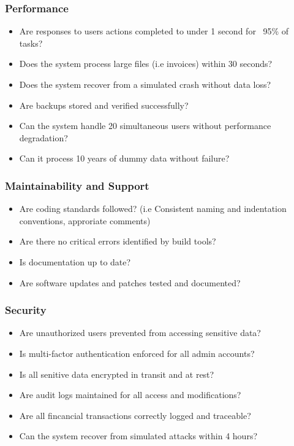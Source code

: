 \documentclass[12pt, titlepage]{article}
\begin{document}
\hypertarget{checklist-nfr12}{}
\subsubsection{Performance}
  \begin{itemize} %
    \item Are responses to users actions completed to under 1 second for ~95\% of tasks?
    \item Does the system process large files (i.e invoices) within 30 seconds?
    \item Does the system recover from a simulated crash without data loss?
    \item Are backups stored and verified successfully?
    \item Can the system handle 20 simultaneous users without performance degradation?
    \item Can it process 10 years of dummy data without failure?
  \end{itemize}

\hypertarget{checklist-nfr14}{}
\subsubsection{Maintainability and Support}
  \begin{itemize} %
    \item Are coding standards followed? (i.e Consistent naming and indentation conventions, approriate comments)
    \item Are there no critical errors identified by build tools?
    \item Is documentation up to date?
    \item Are software updates and patches tested and documented?
  \end{itemize}

\hypertarget{checklist-nfr15}{}
\subsubsection{Security}
  \begin{itemize}%
    \item Are unauthorized users prevented from accessing sensitive data?
    \item Is multi-factor authentication enforced for all admin accounts?
    \item Is all senitive data encrypted in transit and at rest?
    \item Are audit logs maintained for all access and modifications?
    \item Are all fincancial transactions correctly logged and traceable?
    \item Can the system recover from simulated attacks within 4 hours?
  \end{itemize}
\end{document}
